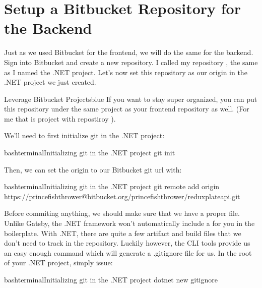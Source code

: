 \documentclass[a4paper,headinclude=on,footinclude=on,12pt,oneside]{scrbook}
\begin{document}
\section{Setup a Bitbucket Repository for the Backend}


Just as we used Bitbucket for the frontend, we will do the same for the backend. Sign into Bitbucket and create a new repository. I called my repository , the same as I named the .NET project. Let's now set this repository as our origin in the .NET project we just created.

\begin{highlightBox}{Leverage Bitbucket Projects}{blue}{\information}
If you want to stay super organized, you can put this repository under the same project as your frontend repository as well. (For me that is project  with repostiroy ). 
\end{highlightBox}


We'll need to first initialize git in the .NET project:

\begin{codeInput}{bash}{terminal}{Initializing git in the .NET project}
git init
\end{codeInput}

Then, we can set the origin to our Bitbucket git url with:

\begin{codeInput}{bash}{terminal}{Initializing git in the .NET project}
git remote add origin https://princefishthrower@bitbucket.org/princefishthrower/reduxplateapi.git
\end{codeInput}


Before commiting anything, we should make sure that we have a proper  file. Unlike Gatsby, the .NET framework won't automatically include a  for you in the boilerplate. With .NET, there are quite a few artifact and build files that we don't need to track in the repository. Luckily however, the  CLI tools provide us an easy enough command which will generate a .gitignore file for us. In the root of your .NET project, simply issue:

\begin{codeInput}{bash}{terminal}{Initializing git in the .NET project}
dotnet new gitignore
\end{codeInput}
\end{document}
